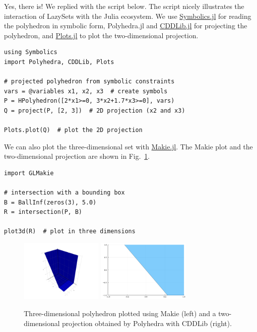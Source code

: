 Yes, there is!
We replied with the script below.
The script nicely illustrates the interaction of LazySets with the Julia ecosystem.
We use \href{https://github.com/JuliaSymbolics/Symbolics.jl}{Symbolics.jl} for reading the polyhedron in symbolic form, Polyhedra.jl and \href{https://github.com/JuliaPolyhedra/CDDLib.jl}{CDDLib.jl} for projecting the polyhedron, and \href{https://github.com/JuliaPlots/Plots.jl}{Plots.jl} to plot the two-dimensional projection.

\begin{minipage}{\linewidth}
\vspace{-\abovedisplayskip}
\begin{lstlisting}
using Symbolics
import Polyhedra, CDDLib, Plots

# projected polyhedron from symbolic constraints
vars = @variables x1, x2, x3  # create symbols
P = HPolyhedron([2*x1>=0, 3*x2+1.7*x3>=0], vars)
Q = project(P, [2, 3])  # 2D projection (x2 and x3)

Plots.plot(Q)  # plot the 2D projection
\end{lstlisting}
\end{minipage}

We can also plot the three-dimensional set with \href{https://github.com/JuliaPlots/Makie.jl}{Makie.jl}.
The Makie plot and the two-dimensional projection are shown in Fig.~\ref{fig:polyhedra}.

\begin{minipage}{\linewidth}
\vspace{-\abovedisplayskip}
\begin{lstlisting}
import GLMakie

# intersection with a bounding box
B = BallInf(zeros(3), 5.0)
R = intersection(P, B)

plot3d(R)  # plot in three dimensions
\end{lstlisting}
\end{minipage}

\begin{figure}
	\centering
	\hfill
	\includegraphics[width=0.49\linewidth, height=3cm, keepaspectratio,clip,trim=65mm 14mm 62mm 19mm]{img/polyhedron3D}
	\hfill
	\includegraphics[width=0.49\linewidth, height=3cm, keepaspectratio]{img/polyhedron2D}
	\hfill\,
	\vspace*{1mm}
	\caption{Three-dimensional polyhedron plotted using Makie (left) and a two-dimensional projection obtained by Polyhedra with CDDLib (right).}
	\label{fig:polyhedra}
\end{figure}

